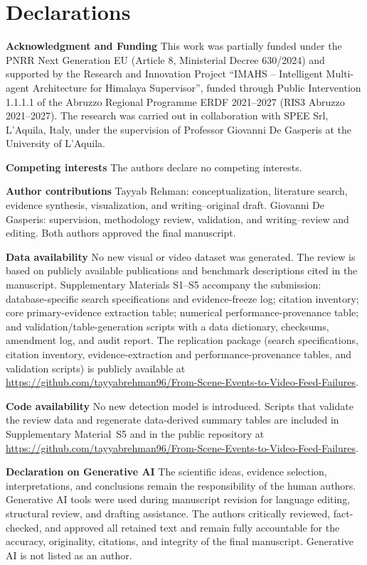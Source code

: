 \documentclass[10pt,a4paper]{article}
\begin{document}
\section*{Declarations}

\textbf{Acknowledgment and Funding} This work was partially funded under the PNRR Next Generation EU (Article 8, Ministerial Decree 630/2024) and supported by the Research and Innovation Project ``IMAHS -- Intelligent Multi-agent Architecture for Himalaya Supervisor'', funded through Public Intervention 1.1.1.1 of the Abruzzo Regional Programme ERDF 2021--2027 (RIS3 Abruzzo 2021--2027). The research was carried out in collaboration with SPEE Srl, L'Aquila, Italy, under the supervision of Professor Giovanni De Gasperis at the University of L'Aquila.

\textbf{Competing interests} The authors declare no competing interests.

\textbf{Author contributions} Tayyab Rehman: conceptualization, literature search, evidence synthesis, visualization, and writing--original draft. Giovanni De Gasperis: supervision, methodology review, validation, and writing--review and editing. Both authors approved the final manuscript.

\textbf{Data availability} No new visual or video dataset was generated. The review is based on publicly available publications and benchmark descriptions cited in the manuscript. Supplementary Materials S1--S5 accompany the submission: database-specific search specifications and evidence-freeze log; citation inventory; core primary-evidence extraction table; numerical performance-provenance table; and validation/table-generation scripts with a data dictionary, checksums, amendment log, and audit report. The replication package (search specifications, citation inventory, evidence-extraction and performance-provenance tables, and validation scripts) is publicly available at \url{https://github.com/tayyabrehman96/From-Scene-Events-to-Video-Feed-Failures}.

\textbf{Code availability} No new detection model is introduced. Scripts that validate the review data and regenerate data-derived summary tables are included in Supplementary Material~S5 and in the public repository at \url{https://github.com/tayyabrehman96/From-Scene-Events-to-Video-Feed-Failures}.

\textbf{Declaration on Generative AI} The scientific ideas, evidence selection, interpretations, and conclusions remain the responsibility of the human authors. Generative AI tools were used during manuscript revision for language editing, structural review, and drafting assistance. The authors critically reviewed, fact-checked, and approved all retained text and remain fully accountable for the accuracy, originality, citations, and integrity of the final manuscript. Generative AI is not listed as an author.
\end{document}
